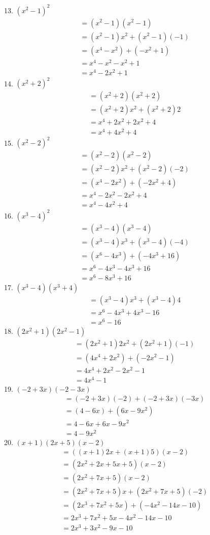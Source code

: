 \documentclass[12pt]{article}
\begin{document}
13. $(x^2-1)^2$
\begin{align*}
&=(x^2-1)(x^2-1) \\
&=(x^2-1)x^2+(x^2-1)(-1) \\
&=(x^4-x^2)+(-x^2+1) \\
&=x^4-x^2-x^2+1 \\
&=x^4-2x^2+1
\end{align*}
14. $(x^2+2)^2$
\begin{align*}
&=(x^2+2)(x^2+2) \\
&=(x^2+2)x^2+(x^2+2)2 \\
&=x^4+2x^2+2x^2+4 \\
&=x^4+4x^2+4
\end{align*}
15. $(x^2-2)^2$
\begin{align*}
&=(x^2-2)(x^2-2) \\
&=(x^2-2)x^2+(x^2-2)(-2) \\
&=(x^4-2x^2)+(-2x^2+4) \\
&=x^4-2x^2-2x^2+4 \\
&=x^4-4x^2+4
\end{align*}
16. $(x^3-4)^2$
\begin{align*}
&=(x^3-4)(x^3-4) \\
&=(x^3-4)x^3+(x^3-4)(-4) \\
&=(x^6-4x^3)+(-4x^3+16) \\
&=x^6-4x^3-4x^3+16 \\
&=x^6-8x^3+16
\end{align*}
17. $(x^3-4)(x^3+4)$
\begin{align*}
&=(x^3-4)x^3+(x^3-4)4 \\
&=x^6-4x^3+4x^3-16 \\
&=x^6-16
\end{align*}
18. $(2x^2+1)(2x^2-1)$
\begin{align*}
&=(2x^2+1)2x^2+(2x^2+1)(-1) \\
&=(4x^4+2x^2)+(-2x^2-1) \\
&=4x^4+2x^2-2x^2-1 \\
&=4x^4-1
\end{align*}
19. $(-2+3x)(-2-3x)$
\begin{align*}
&=(-2+3x)(-2)+(-2+3x)(-3x) \\
&=(4-6x)+(6x-9x^2) \\
&=4-6x+6x-9x^2 \\
&=4-9x^2
\end{align*}
20. $(x+1)(2x+5)(x-2)$
\begin{align*}
&=((x+1)2x+(x+1)5)(x-2) \\
&=(2x^2+2x+5x+5)(x-2) \\
&=(2x^2+7x+5)(x-2) \\
&=(2x^2+7x+5)x+(2x^2+7x+5)(-2) \\
&=(2x^3+7x^2+5x)+(-4x^2-14x-10) \\
&=2x^3+7x^2+5x-4x^2-14x-10 \\
&=2x^3+3x^2-9x-10
\end{align*}
\end{document}
